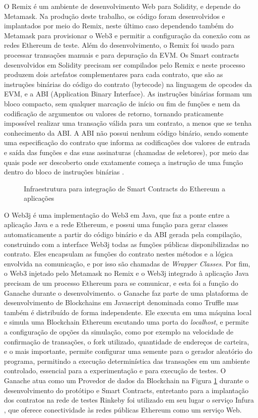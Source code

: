 \documentclass[a4paper,11pt]{article}
\begin{document}
O Remix é um ambiente de desenvolvimento Web para Solidity, e depende do Metamask.
Na produção deste trabalho, os código foram desenvolvidos e implantados por meio do Remix, neste último caso dependendo também do Metamask para provisionar o Web3 e permitir a configuração da conexão com as redes Ethereum de teste.
Além do desenvolvimento, o Remix foi usado para processar transações manuais e para depuração da EVM.
Os Smart contracts desenvolvidos em Solidity precisam ser compilados pelo Remix e neste processo produzem dois artefatos complementares para cada contrato, que são as instruções binárias do código do contrato (bytecode) na linguagem de opcodes da EVM, e a ABI (Application Binary Interface).
As instruções binárias formam um bloco compacto, sem qualquer marcação de início ou fim de funções e nem da codificação de argumentos ou valores de retorno, tornando praticamente impossível realizar uma transação válida para um contrato, a menos que se tenha conhecimento da ABI.
A ABI não possui nenhum código binário, sendo somente uma especificação do contrato que informa as codificações dos valores de entrada e saída das funções e das suas assinaturas (chamadas de seletores), por meio das quais pode ser descoberto onde exatamente começa a instrução de uma função dentro do bloco de instruções binárias \cite{Solidity2020}.

\begin{figure}[!h]
  \centering
  
  \caption{Infraestrutura para integração de Smart Contracts do Ethereum a aplicações}
  \label{fig:infraestruturaBlockchain}
\end{figure}
O Web3j é uma implementação do Web3 em Java, que faz a ponte entre a aplicação Java e a rede Ethereum, e possui uma função para gerar classes automaticamente a partir do código binário e da ABI gerada pela compilação, construindo com a interface Web3j todas as funções públicas disponibilizadas no contrato.
Eles encapsulam as funções do contrato nestes métodos e a lógica envolvida na comunicação, e por isso são chamadas de \emph{Wrapper Classes}.
Por fim, o Web3 injetado pelo Metamask no Remix e o Web3j integrado à aplicação Java precisam de um processo Ethereum para se comunicar, e esta foi a função do Ganache durante o desenvolvimento.
o Ganache faz parte de uma plataforma de desenvolvimento de Blockchains em Javascript denominada como Truffle mas também é distribuído de forma independente.
Ele executa em uma máquina local e simula uma Blockchain Ethereum escutando uma porta do \emph{localhost}, e permite a configuração de opções da simulação, como por exemplo na velocidade de confirmação de transações, o fork utilizado, quantidade de endereços de carteira, e o mais importante, permite configurar uma semente para o gerador aleatório do programa, permitindo a execução determinística das transações em um ambiente controlado, essencial para a experimentação e para execução de testes.
O Ganache atua como um Provedor de dados da Blockchain na Figura \ref{fig:infraestruturaBlockchain} durante o desenvolvimento do protótipo e Smart Contracts, entretanto para a implantação dos contratos na rede de testes Rinkeby foi utilizado em seu lugar o serviço Infura \cite{Infura2020}, que oferece conectividade às redes públicas Ethereum como um serviço Web.
\end{document}
